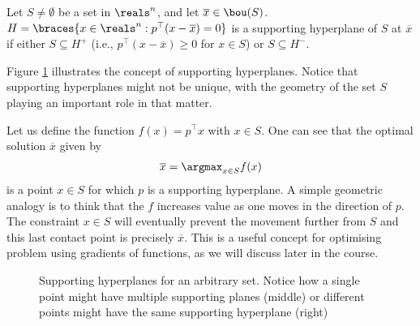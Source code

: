 \begin{definition}
	Let $S \neq \emptyset$ be a set in $\reals^n$, and let $\overline{x} \in \bou(S)$. $H = \braces{x \in \reals^n : p^\top (x-\overline{x}) =0}$ is a supporting hyperplane of $S$ at $\overline{x}$ if either $S \subseteq H^+$ (i.e., $p^\top (x-\overline{x}) \geq 0$ for $x \in S$) or $S \subseteq H^-$.  
\end{definition}

Figure \ref{fig:support_hyperplane} illustrates the concept of supporting hyperplanes. Notice that supporting hyperplanes might not be unique, with the geometry of the set $S$ playing an important role in that matter. 

Let us define the function $f(x) = p^\top x$ with $x \in S$. One can see that the optimal solution $\overline{x}$ given by 
%
\begin{align*}
	\overline{x} = \argmax_{x \in S} f(x)
\end{align*}
%
is a point $x \in S$ for which $p$ is a supporting hyperplane. A simple geometric analogy is to think that the $f$ increases value as one moves in the direction of $p$. The constraint $x \in S$ will eventually prevent the movement further from $S$ and this last contact point is precisely $\overline{x}$. This is a useful concept for optimising problem using gradients of functions, as we will discuss later in the course.

\begin{figure}[h]
	\caption{Supporting hyperplanes for an arbitrary set. Notice how a single point might have multiple supporting planes (middle) or different points might have the same supporting hyperplane (right)} \label{fig:support_hyperplane} 
\end{figure}

